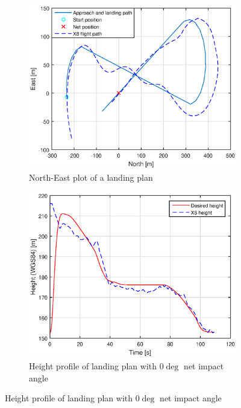 \newpage
\begin{figure}[H]
\begin{subfigure}[H]{1\textwidth}
	\centering
		\includegraphics[width=1\textwidth]{figs/Experiment/NorthEast31mai105034.eps}
		\caption{North-East plot of a landing plan}
		\label{Fig:NorthEast31mai105034}
\end{subfigure}
\begin{subfigure}[H]{1\textwidth}
		\includegraphics[width=1\textwidth]{figs/Experiment/Height31mai105034.eps}
		\caption{Height profile of landing plan with $0 \deg$ net impact angle}
		\label{Fig:Height31mai31mai105034}
\end{subfigure}
\end{figure}

